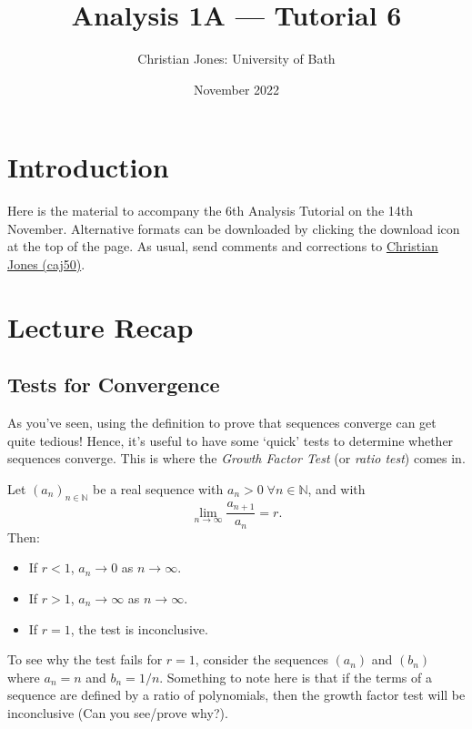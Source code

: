 \documentclass[
  10pt,
  a4paper]{article}
\title{Analysis 1A --- Tutorial 6}
\author{Christian Jones: University of Bath}
\date{November 2022}
\providecommand{\tightlist}{%
  \setlength{\itemsep}{0pt}\setlength{\parskip}{0pt}}
\theoremstyle{plain}
\theoremstyle{plain}
\theoremstyle{plain}
\theoremstyle{plain}
\theoremstyle{plain}
\theoremstyle{definition}
\theoremstyle{definition}
\theoremstyle{definition}
\theoremstyle{remark}
\let\BeginKnitrBlock\begin \let\EndKnitrBlock\end
\begin{document}
\maketitle

{
\setcounter{tocdepth}{2}
\tableofcontents
}
\newpage
{}

\hypertarget{introduction}{%
\section*{Introduction}\label{introduction}}

Here is the material to accompany the 6th Analysis Tutorial on the 14th November. Alternative formats can be downloaded by clicking the download icon at the top of the page. As usual, send comments and corrections to \href{mailto:caj50@bath.ac.uk}{Christian Jones (caj50)}.

\hypertarget{lecture-recap}{%
\section{Lecture Recap}\label{lecture-recap}}

\hypertarget{tests-for-convergence}{%
\subsection{Tests for Convergence}\label{tests-for-convergence}}

As you've seen, using the definition to prove that sequences converge can get quite tedious! Hence, it's useful to have some `quick' tests to determine whether sequences converge. This is where the \emph{Growth Factor Test} (or \emph{ratio test}) comes in.

\BeginKnitrBlock{theorem}[Growth Factor Test]
{\label{thm:thm1} }Let \((a_n)_{n\in\mathbb{N}}\) be a real sequence with \(a_n>0 \; \forall n\in\mathbb{N}\), and with \[\lim_{n\to\infty} \frac{a_{n+1}}{a_n} = r.\] Then:

\begin{itemize}
\tightlist
\item
  If \(r < 1\), \(a_n \to 0\) as \(n \to \infty\).
\item
  If \(r > 1\), \(a_n \to \infty\) as \(n \to \infty\).
\item
  If \(r = 1\), the test is inconclusive.
\end{itemize}
\EndKnitrBlock{theorem}

To see why the test fails for \(r = 1\), consider the sequences \((a_n)\) and \((b_n)\) where \(a_n = n\) and \(b_n = 1/n\). Something to note here is that if the terms of a sequence are defined by a ratio of polynomials, then the growth factor test will be inconclusive (Can you see/prove why?).
\end{document}
